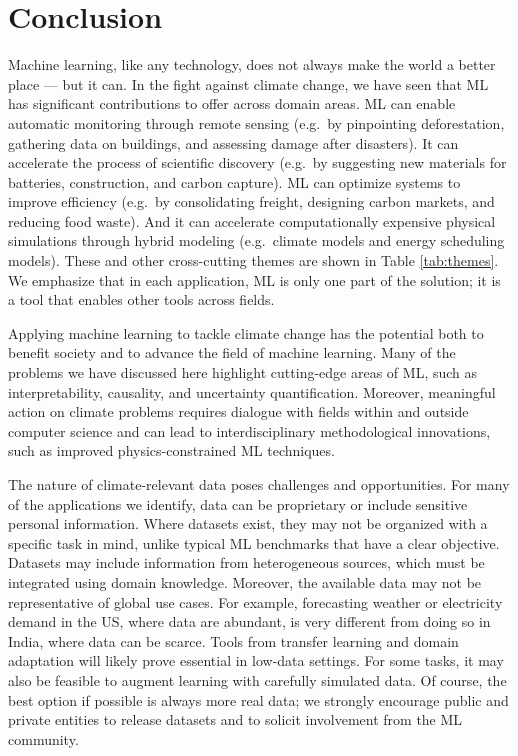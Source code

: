 \documentclass[11pt]{report}
\begin{document}
\part*{Conclusion}

Machine learning, like any technology, does not always make the world a better place --- but it can. In the fight against climate change, we have seen that ML has significant contributions to offer across domain areas. ML can enable automatic monitoring through remote sensing (e.g.~by pinpointing deforestation, gathering data on buildings, and assessing damage after disasters). It can accelerate the process of scientific discovery (e.g.~by suggesting new materials for batteries, construction, and carbon capture). ML can optimize systems to improve efficiency (e.g.~by consolidating freight, designing carbon markets, and reducing food waste). And it can accelerate computationally expensive physical simulations through hybrid modeling (e.g.~climate models and energy scheduling models). These and other cross-cutting themes are shown in Table \ref{tab:themes}. We emphasize that in each application, ML is only one part of the solution; it is a tool that enables other tools across fields.

Applying machine learning to tackle climate change has the potential both to benefit society and to advance the field of machine learning. Many of the problems we have discussed here highlight cutting-edge areas of ML, such as interpretability, causality, and uncertainty quantification. Moreover, meaningful action on climate problems requires dialogue with fields within and outside computer science and can lead to interdisciplinary methodological innovations, such as improved physics-constrained ML techniques.

The nature of climate-relevant data poses challenges and opportunities. For many of the applications we identify, data can be proprietary or include sensitive personal information. Where datasets exist, they may not be organized with a specific task in mind, unlike typical ML benchmarks that have a clear objective. Datasets may include information from  heterogeneous sources, which must be integrated using domain knowledge. Moreover, the available data may not be representative of global use cases. For example, forecasting weather or electricity demand in the US, where data are abundant, is very different from doing so in India, where data can be scarce. Tools from transfer learning and domain adaptation will likely prove essential in low-data settings. For some tasks, it may also be feasible to augment learning with carefully simulated data. Of course, the best option if possible is always more real data; we strongly encourage public and private entities to release datasets and to solicit involvement from the ML community.
\end{document}
